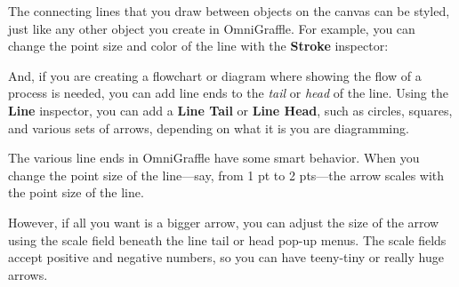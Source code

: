 \documentclass[../main.tex]{subfiles}
\begin{document}
The connecting lines that you draw between objects on the canvas can be styled, just like any
other object you create in OmniGraffle. For example, you can change the point size and color
of the line with the \textbf{Stroke} inspector:


And, if you are creating a flowchart or diagram where showing the flow of a process is needed,
you can add line ends to the \textit{tail} or \textit{head} of the line. Using the
\textbf{Line} inspector, you can add a \textbf{Line Tail} or \textbf{Line Head}, such as
circles, squares, and various sets of arrows, depending on what it is you are diagramming.


The various line ends in OmniGraffle have some smart behavior. When you change the point size of
the line---say, from 1 pt to 2 pts---the arrow scales with the point size of the line.


However, if all you want is a bigger arrow, you can adjust the size of the arrow using the scale
field beneath the line tail or head pop-up menus. The scale fields accept positive and
negative numbers, so you can have teeny-tiny or really huge arrows.

\end{document}
